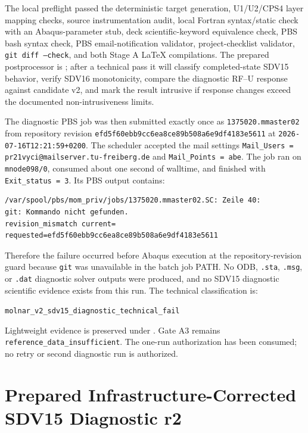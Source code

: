 \documentclass[11pt,a4paper]{article}
\begin{document}
The local preflight passed the deterministic target generation, U1/U2/CPS4 layer mapping checks, source instrumentation audit, local Fortran syntax/static check with an Abaqus-parameter stub, deck scientific-keyword equivalence check, PBS bash syntax check, PBS email-notification validator, project-checklist validator, \texttt{git diff --check}, and both Stage A LaTeX compilations. The prepared postprocessor is ; after a technical pass it will classify completed-state SDV15 behavior, verify SDV16 monotonicity, compare the diagnostic RF--U response against candidate v2, and mark the result intrusive if response changes exceed the documented non-intrusiveness limits.

The diagnostic PBS job was then submitted exactly once as \texttt{1375020.mmaster02} from repository revision \texttt{efd5f60ebb9cc6ea8ce89b508a6e9df4183e5611} at \texttt{2026-07-16T12:21:59+0200}. The scheduler accepted the mail settings \texttt{Mail\_Users = pr21vyci@mailserver.tu-freiberg.de} and \texttt{Mail\_Points = abe}. The job ran on \texttt{mnode098/0}, consumed about one second of walltime, and finished with \texttt{Exit\_status = 3}. Its PBS output contains:

\begin{verbatim}
/var/spool/pbs/mom_priv/jobs/1375020.mmaster02.SC: Zeile 40:
git: Kommando nicht gefunden.
revision_mismatch current= requested=efd5f60ebb9cc6ea8ce89b508a6e9df4183e5611
\end{verbatim}

Therefore the failure occurred before Abaqus execution at the repository-revision guard because \texttt{git} was unavailable in the batch job PATH. No ODB, \texttt{.sta}, \texttt{.msg}, or \texttt{.dat} diagnostic solver outputs were produced, and no SDV15 diagnostic scientific evidence exists from this run. The technical classification is:

\begin{center}
\texttt{molnar\_v2\_sdv15\_diagnostic\_technical\_fail}
\end{center}

Lightweight evidence is preserved under . Gate A3 remains \texttt{reference\_data\_insufficient}. The one-run authorization has been consumed; no retry or second diagnostic run is authorized.

\section{Prepared Infrastructure-Corrected SDV15 Diagnostic r2}
\end{document}
